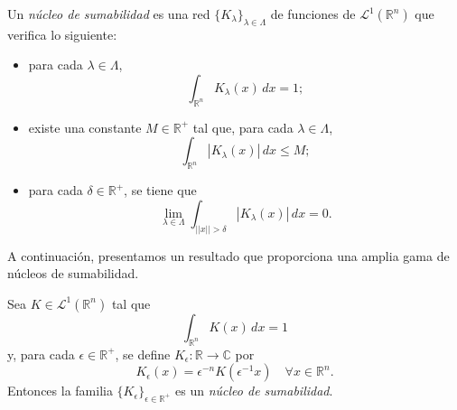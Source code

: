\begin{definicion}\label{defnucl}
    Un\textit{ núcleo de sumabilidad} es una red $\{K_{\lambda}\}_{\lambda \in \Lambda}$ de funciones de $\mathscr{L}^1(\mathbb{R}^n)$ que verifica lo siguiente:
    \begin{itemize}
        \item para cada $\lambda \in \Lambda$,
        \begin{equation}
            \int_{\mathbb{R}^n} K_{\lambda}(x) \, dx = 1;
        \end{equation}

        \item existe una constante $M \in \mathbb{R}^+$ tal que, para cada $\lambda \in \Lambda$,
        \begin{equation}
            \int_{\mathbb{R}^n} |K_{\lambda}(x)| \, dx \leq M;
        \end{equation}
        \item  para cada $\delta \in \mathbb{R}^+$, se tiene que 
        \begin{equation}
            \lim_{\lambda \in \Lambda} \int_{||x|| > \delta} |K_{\lambda}(x)|\, dx = 0.
        \end{equation}
        
    \end{itemize}
\end{definicion}



\noindent A continuación, presentamos un resultado que proporciona una amplia gama de núcleos de sumabilidad.



\begin{proposicion}\label{consnuc}
Sea $K  \in \mathscr{L}^1(\mathbb{R}^n)$ tal que 
\begin{equation}
    \int_{\mathbb{R}^n}K(x) \, dx = 1
\end{equation}
y, para cada $\epsilon \in \mathbb{R}^+$, se define $K_{\epsilon}: \mathbb{R} \rightarrow \mathbb{C}$ por
\begin{equation}
    K_{\epsilon}(x) = \epsilon^{-n}K(\epsilon^{-1}x) \quad \forall x \in \mathbb{R}^n.
\end{equation}
Entonces la familia $\{K_{\epsilon}\}_{\epsilon \in \mathbb{R}^+}$ es un \textit{núcleo de sumabilidad}.
\end{proposicion}

